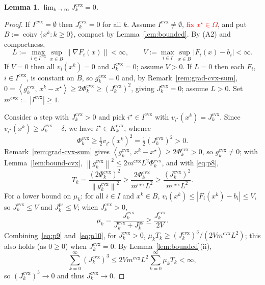 \documentclass[]{interact}
\theoremstyle{plain}
\newtheorem{lemma}[theorem]{Lemma}
\theoremstyle{definition}
\theoremstyle{remark}
\newcommand{\norm}[1]{\left\lVert #1 \right\rVert}
\newcommand{\abs}[1]{\left\lvert #1 \right\rvert}
\newcommand{\inner}[2]{\left\langle #1,\, #2 \right\rangle}
\DeclareMathOperator{\conv}{conv}
\newcommand{\cvx}{\mathrm{cvx}}
\newcommand{\ps}{\mathrm{ps}}
\begin{document}
\begin{lemma}\label{lem:jcvx0}
$\displaystyle\lim_{k\to\infty}J^{\cvx}_k=0$.
\end{lemma}
\begin{proof}
If $I^{\cvx}=\emptyset$ then $J^{\cvx}_k=0$ for all $k$. Assume $I^{\cvx}\ne\emptyset$, \leavevmode\textcolor{red}{fix $x^\star\in\Omega$}, and put $B:=\overline{\conv}\{x^k:k\ge0\}$, compact by Lemma~\ref{lem:bounded}. By (A2) and compactness,
\[
L:=\max_{i\in I^{\cvx}}\sup_{x\in B}\norm{\nabla F_i(x)}<\infty,\qquad
V:=\max_{i\in I}\sup_{x\in B}\abs{F_i(x)-b_i}<\infty.
\]
If $V=0$ then all $v_i(x^k)=0$ and $J^{\cvx}_k=0$; assume $V>0$. If $L=0$ then each $F_i$, $i\in I^{\cvx}$, is constant on $B$, so $g^{\cvx}_k=0$ and, by Remark~\ref{rem:grad-cvx-sum}, $0=\inner{g^{\cvx}_k}{x^k-x^\star}\ge 2\Phi^{\cvx}_k\ge(J^{\cvx}_k)^2$, giving $J^{\cvx}_k=0$; assume $L>0$. Set $m^{\cvx}:=\abs{I^{\cvx}}\ge1$.

Consider a step with $J^{\cvx}_k>0$ and pick $i^\star\in I^{\cvx}$ with $v_{i^\star}(x^k)=J^{\cvx}_k$. Since $v_{i^\star}(x^k)\ge J^{\cvx}_k-\delta$, we have $i^\star\in K^{\cvx}_k$, whence
\begin{equation}\label{eq:p8}
\Phi^{\cvx}_k\ge\tfrac12 v_{i^\star}(x^k)^2=\tfrac12(J^{\cvx}_k)^2>0 .
\end{equation}
Remark~\ref{rem:grad-cvx-sum} gives $\inner{g^{\cvx}_k}{x^k-x^\star}\ge2\Phi^{\cvx}_k>0$, so $g^{\cvx}_k\ne0$; with Lemma~\ref{lem:bound-cvx}, $\norm{g^{\cvx}_k}^2\le2m^{\cvx}L^2\Phi^{\cvx}_k$, and with \eqref{eq:p8},
\begin{equation}\label{eq:p9}
T_k=\frac{(2\Phi^{\cvx}_k)^2}{\norm{g^{\cvx}_k}^2}\ge\frac{2\Phi^{\cvx}_k}{m^{\cvx}L^2}\ge\frac{(J^{\cvx}_k)^2}{m^{\cvx}L^2}.
\end{equation}
For a lower bound on $\mu_k$: for all $i\in I$ and $x^k\in B$, $v_i(x^k)\le\abs{F_i(x^k)-b_i}\le V$, so $J^{\cvx}_k\le V$ and $J^{\ps}_k\le V$; when $J^{\cvx}_k>0$,
\begin{equation}\label{eq:p10}
\mu_k=\frac{J^{\cvx}_k}{J^{\cvx}_k+J^{\ps}_k}\ge\frac{J^{\cvx}_k}{2V}.
\end{equation}
Combining~\eqref{eq:p9} and~\eqref{eq:p10}, for $J^{\cvx}_k>0$, $\mu_k T_k\ge(J^{\cvx}_k)^3/(2Vm^{\cvx}L^2)$; this also holds (as $0\ge0$) when $J^{\cvx}_k=0$. By Lemma~\ref{lem:bounded}(ii),
\begin{equation}\label{eq:p12}
\sum_{k=0}^\infty(J^{\cvx}_k)^3\le 2Vm^{\cvx}L^2\sum_{k=0}^\infty\mu_k T_k<\infty,
\end{equation}
so $(J^{\cvx}_k)^3\to0$ and thus $J^{\cvx}_k\to0$.
\end{proof}
\end{document}
